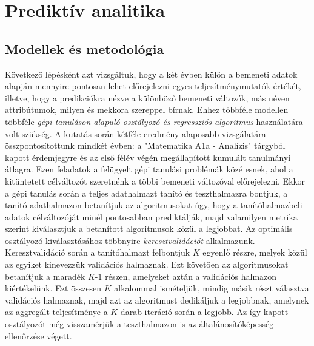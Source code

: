 \documentclass[12pt]{article}
\begin{document}
\newpage
\section{Prediktív analitika}

\subsection{Modellek és metodológia}

Következő lépésként azt vizsgáltuk, hogy a két évben külön a bemeneti adatok alapján mennyire pontosan lehet előrejelezni egyes teljesítménymutatók értékét, illetve, hogy a predikciókra nézve a különböző bemeneti változók, más néven attribútumok, milyen és mekkora szereppel bírnak. Ehhez többféle modellen többféle \textit{gépi tanuláson alapuló osztályozó és regressziós algoritmus} használatára volt szükség. A kutatás során kétféle eredmény alaposabb vizsgálatára összpontosítottunk mindkét évben: a "Matematika A1a - Analízis" tárgyból kapott érdemjegyre és az első félév végén megállapított kumulált tanulmányi átlagra. Ezen feladatok a felügyelt gépi tanulási problémák közé esnek, ahol a kitüntetett célváltozót szeretnénk a többi bemeneti változóval előrejelezni\cite{bevadat}. Ekkor a gépi tanulás során a teljes adathalmazt tanító és teszthalmazra bontjuk, a tanító adathalmazon betanítjuk az algoritmusokat úgy, hogy a tanítóhalmazbeli adatok célváltozóját minél pontosabban prediktálják, majd valamilyen metrika szerint kiválasztjuk a betanított algoritmusok közül a legjobbat. Az optimális osztályozó kiválasztásához többnyire \textit{keresztvalidációt} alkalmazunk. Keresztvalidáció során a tanítóhalmazt felbontjuk $K$ egyenlő részre, melyek közül az egyiket kinevezzük validációs halmaznak. Ezt követően az algoritmusokat betanítjuk a maradék $K$-$1$ részen, amelyeket aztán a validációs halmazon kiértékelünk. Ezt összesen $K$ alkalommal ismételjük, mindig másik részt választva validációs halmaznak, majd azt az algoritmust dedikáljuk a legjobbnak, amelynek az aggregált teljesítménye a $K$ darab iteráció során a legjobb. Az így kapott osztályozót még visszamérjük a teszthalmazon is az általánosítóképesség ellenőrzése végett. %
\end{document}
